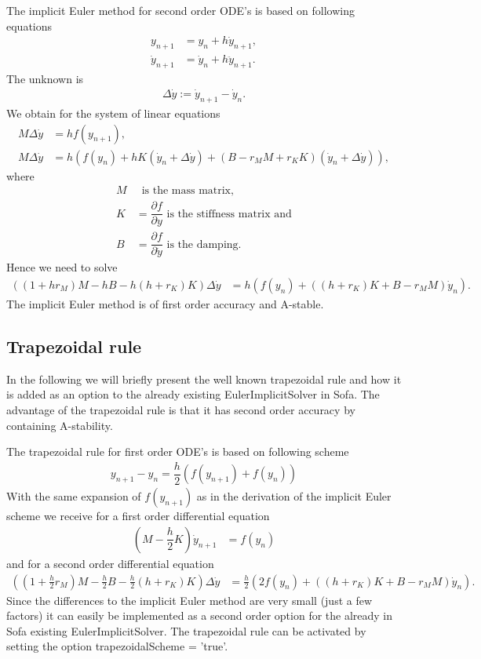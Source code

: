 \documentclass[a4paper,11pt]{article}
\begin{document}
The implicit Euler method for second order ODE's is based on following equations
\begin{align*}
{y}_{n+1} &= {y}_{n} + h \dot{y}_{n+1}, \\
\dot{y}_{n+1} &= \dot{y}_{n} + h \ddot{y}_{n+1}.
\end{align*}
The unknown is
\begin{align*}
\Delta \dot{y} := \dot{y}_{n+1} - \dot{y}_{n}.
\end{align*}
We obtain for the system of linear equations 
\begin{align*}
M \Delta\dot{y} &= h f(y_{n+1}), \\
M \Delta\dot{y} &= h \left( f(y_{n}) +  h K (\dot{y}_{n} + \Delta\dot{y}) + (B - r_M M +r_K K)  (\dot{y}_{n} + \Delta\dot{y}) \right),
\end{align*}
where
\begin{align*}
M& \ \text{ is the mass matrix},\\
K& = \dfrac{\partial f}{\partial y} \text{ is the stiffness matrix and}\\
B& = \dfrac{\partial f}{\partial \dot{y}} \text{ is the damping}.
\end{align*}
Hence we need to solve
\begin{align*}
\left( (1+h r_M) M - h B - h (h+r_K) K \right) \Delta\dot{y} &= h \left( f(y_{n}) +  ((h+r_K) K + B - r_M M) \dot{y}_{n} \right).
\end{align*}
The implicit Euler method is of first order accuracy and A-stable. 



\subsection*{Trapezoidal rule}
In the following we will briefly present the well known trapezoidal rule and how it is added as an option to the already existing EulerImplicitSolver in Sofa.
The advantage of the trapezoidal rule is that it has second order accuracy by containing A-stability.

The trapezoidal rule for first order ODE's is based on following scheme
\begin{align*}
y_{n+1} - y_{n} = \dfrac{h}{2} \left( f(y_{n+1}) + f(y_{n}) \right)
\end{align*}
With the same expansion of $f(y_{n+1})$ as in the derivation of the implicit Euler scheme we receive  for a first order differential equation
\begin{align*}
\left( M - \dfrac{h}{2} K \right) \dot{y}_{n+1} &= f(y_{n})
\end{align*}
and for a second order differential equation 
\begin{align*}
\left( (1+ \frac{h}{2} r_M) M - \frac{h}{2} B - \frac{h}{2} (h+r_K) K \right) \Delta\dot{y} &= \frac{h}{2} \left( 2 f(y_{n}) +  ((h+r_K) K + B - r_M M) \dot{y}_{n} \right).
\end{align*}
Since the differences to the implicit Euler method are very small (just a few factors) it can easily be implemented as a second order option for the already in Sofa existing EulerImplicitSolver. The trapezoidal rule can be activated by setting the option trapezoidalScheme = 'true'.
\end{document}
